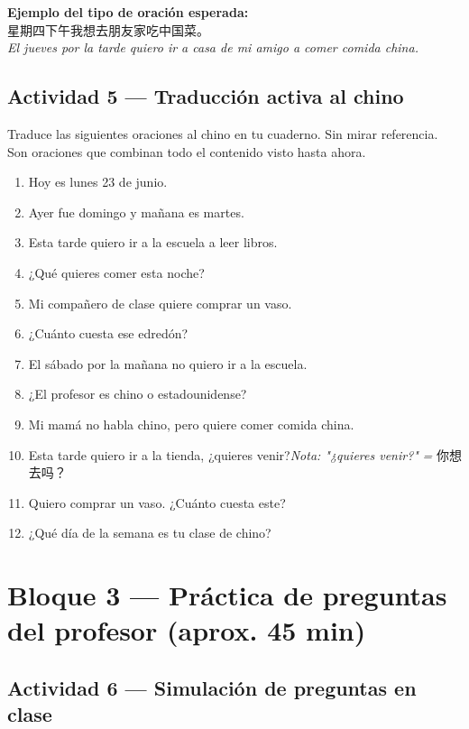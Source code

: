 \documentclass[12pt, a4paper]{article}
\begin{document}
\begin{cuadrogris}
\textbf{Ejemplo del tipo de oración esperada:}\\
星期四下午我想去朋友家吃中国菜。\\
\textit{El jueves por la tarde quiero ir a casa de mi amigo a comer comida china.}
\end{cuadrogris}

\subsection{Actividad 5 — Traducción activa al chino}

Traduce las siguientes oraciones al chino en tu cuaderno. Sin mirar referencia. Son oraciones que combinan todo el contenido visto hasta ahora.

\begin{enumerate}[leftmargin=1.5cm]
\item Hoy es lunes 23 de junio.
\item Ayer fue domingo y mañana es martes.
\item Esta tarde quiero ir a la escuela a leer libros.
\item ¿Qué quieres comer esta noche?
\item Mi compañero de clase quiere comprar un vaso.
\item ¿Cuánto cuesta ese edredón?
\item El sábado por la mañana no quiero ir a la escuela.
\item ¿El profesor es chino o estadounidense?
\item Mi mamá no habla chino, pero quiere comer comida china.
\item Esta tarde quiero ir a la tienda, ¿quieres venir?\quad \textit{Nota: "¿quieres venir?"}\textit{ = }{你想去吗？}
\item Quiero comprar un vaso. ¿Cuánto cuesta este?
\item ¿Qué día de la semana es tu clase de chino?
\end{enumerate}

\section{Bloque 3 — Práctica de preguntas del profesor (aprox. 45 min)}

\subsection{Actividad 6 — Simulación de preguntas en clase}
\end{document}
